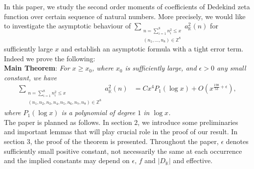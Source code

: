 \documentclass[preprint,12pt]{elsarticle}
\numberwithin{equation}{section}
\begin{document}
In this paper, we study the second order moments of coefficients of Dedekind zeta function over certain sequence of natural numbers. More precisely, we would like to investigate the asymptotic behaviour of $\sum\limits_{\substack{ n= \sum_{i=1}^{8}n_{i}^{2}\leq x\\ (n_{1},\dots,n_{8})\in \mathbb{Z}^{8}  }} a_{\mathbb{K}}^{2}(n)$ for sufficiently large $x$ and establish an asymptotic formula with a tight error term.\\

\noindent Indeed we prove the following:\\
\noindent\textbf{Main Theorem}:	\textit{ For $x\geq x_{0}$, where $x_{0}$ is sufficiently large, and $\epsilon>0$ any small constant, we have
	\begin{align*} 
		\sum\limits_{\substack{n= \sum_{i=1}^{8}n_{i}^{2}\leq x\\ (n_{1},n_{2},n_{3},n_{4},n_{5},n_{6},n_{7},n_{8})\in \mathbb{Z}^{8}  }} a_{\mathbb{K}}^{2}(n)&=C x^{4} P_{1}(\log{x})+O(x^{\frac{198}{53}+\epsilon}),
	\end{align*}
	where $P_{1}(\log{x})$ is a polynomial of degree $1$ in $\log{x}$.
}\\

The paper is planned as follows. In section $2$, we introduce some preliminaries and important lemmas that will play crucial role in the proof of our result. In section $3$, the proof of the theorem is presented. Throughout the paper, $\epsilon$ denotes sufficiently small positive constant, not necessarily the same at each occurrence and the implied constants may depend on $\epsilon,\,f$ and $|D_{\mathbb{K}}|$ and effective.  
\end{document}
